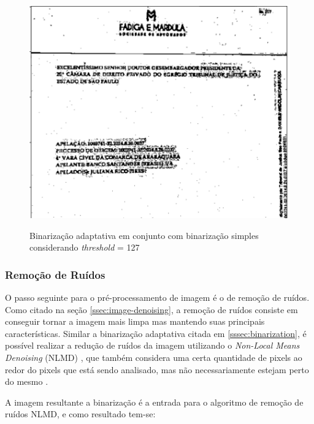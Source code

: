 \begin{figure}[H]
  \centering
  \caption{Binarização adaptativa  em conjunto com binarização simples considerando \textit{threshold} = 127}
  \includegraphics[scale=.7]{figuras/binarizacao-adaptativa.png}
  \label{fig:binarizacao-adaptativa}
\end{figure}

\subsubsection{Remoção de Ruídos}

O passo seguinte para o pré-processamento de imagem é o de remoção de ruídos. Como citado na seção \ref{ssec:image-denoising}, a remoção de ruídos consiste em conseguir tornar a imagem mais limpa mas mantendo suas principais características. Similar a binarização adaptativa citada em \ref{sssec:binarization}, é possível realizar a redução de ruídos da imagem utilizando o \textit{Non-Local Means Denoising} (NLMD) \cite{non-local-means-denoising}, que também considera uma certa quantidade de pixels ao redor do pixels que está sendo analisado, mas não necessariamente estejam perto do mesmo \cite{non-local-means-denoising}.

A imagem resultante a binarização é a entrada para o algoritmo de remoção de ruídos NLMD, e como resultado tem-se:

